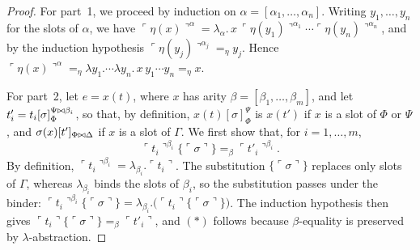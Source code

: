 \begin{proof}
    For part~1, we proceed by induction on $\alpha = [\alpha_1, \ldots, \alpha_n]$. Writing $y_1, \ldots, y_n$ for the slots of $\alpha$, we have $\ulcorner \eta(x) \urcorner^\alpha = \lambda_\alpha.\, x\, \ulcorner \eta(y_1) \urcorner^{\alpha_1} \cdots \ulcorner \eta(y_n) \urcorner^{\alpha_n}$, and by the induction hypothesis $\ulcorner \eta(y_j) \urcorner^{\alpha_j} =_\eta y_j$. Hence $\ulcorner \eta(x) \urcorner^\alpha =_\eta \lambda y_1. \cdots \lambda y_n.\, x\, y_1 \cdots y_n =_\eta x$.

    For part~2, let $e = x(t)$, where $x$ has arity $\beta = [\beta_1, \ldots, \beta_m]$, and let $t'_i = t_i[\sigma]_\Phi^{\Psi \mathbin{\bowtie} \beta_i}$, so that, by definition, $x(t)[\sigma]_\Phi^\Psi$ is $x(t')$ if $x$ is a slot of $\Phi$ or $\Psi$, and $\sigma(x)[t']_{\Phi \mathbin{\bowtie} \Delta}$ if $x$ is a slot of $\Gamma$.
    We first show that, for $i = 1, \ldots, m$,
    \[
    \ulcorner t_i \urcorner^{\beta_i}\{\ulcorner \sigma \urcorner\} =_\beta \ulcorner t'_i \urcorner^{\beta_i}. \tag{$*$}
    \]
    By definition, $\ulcorner t_i \urcorner^{\beta_i} = \lambda_{\beta_i}. \ulcorner t_i \urcorner$. The substitution $\{\ulcorner \sigma \urcorner\}$ replaces only slots of $\Gamma$, whereas $\lambda_{\beta_i}$ binds the slots of $\beta_i$, so the substitution passes under the binder: $\ulcorner t_i \urcorner^{\beta_i}\{\ulcorner \sigma \urcorner\} = \lambda_{\beta_i}. \big(\ulcorner t_i \urcorner\{\ulcorner \sigma \urcorner\}\big)$. The induction hypothesis then gives $\ulcorner t_i \urcorner\{\ulcorner \sigma \urcorner\} =_\beta \ulcorner t'_i \urcorner$, and $(*)$ follows because $\beta$-equality is preserved by $\lambda$-abstraction.


\end{proof}
